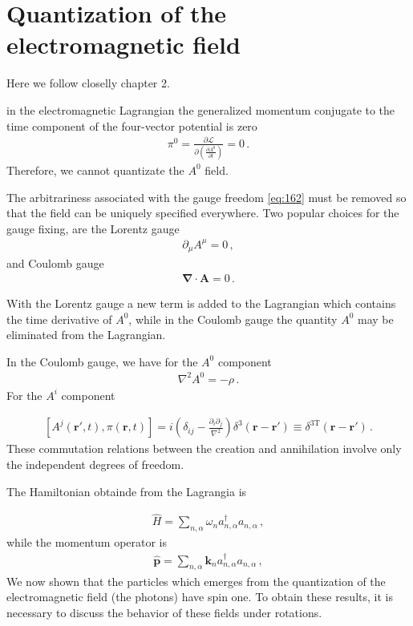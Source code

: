 \section{Quantization of the electromagnetic field}
Here we follow closelly \cite{Gross:1993} chapter 2.

in the electromagnetic Lagrangian the generalized momentum conjugate to the time component of the four-vector potential is zero
\begin{align}
  \pi^0=\frac{\partial\mathcal{L}}{\partial\left(\displaystyle{\frac{\partial A^0}{\partial t}}\right)}=0\,.
\end{align}
Therefore, we cannot quantizate the $A^0$ field.

The arbitrariness associated with the gauge freedom \eqref{eq:162} must be removed so that the field can be uniquely specified everywhere. Two popular choices for the gauge fixing, are the Lorentz gauge
\begin{align}
  \partial_\mu A^\mu=0\,,
\end{align}
and Coulomb gauge
\begin{align}
  \boldsymbol{\nabla}\cdot \mathbf{A}=0\,.
\end{align}

With the Lorentz gauge a new term is added to the Lagrangian which contains the time derivative of $A^0$, while in the Coulomb gauge the quantity $A^0$ may be eliminated from the Lagrangian.

In the Coulomb gauge, we have for the $A^0$ component
\begin{align}
  \nabla^2A^0=-\rho\,.
\end{align}
For the $A^i$ component

\begin{align}
  \left[A^j(\mathbf{r}',t),\pi(\mathbf{r},t)\right]=i\left(\delta_{ij}-\frac{\partial_i\partial_j}{\nabla^2}\right)\delta^3(\mathbf{r}-\mathbf{r}')
\equiv \delta^{3 \text{T}}(\mathbf{r}-\mathbf{r}')\,.
\end{align}
These commutation relations between the creation and annihilation involve only the independent degrees of freedom.

The Hamiltonian obtainde from the Lagrangia is

\begin{align}
  \widehat{H}=\sum_{n,\alpha}\omega_n a_{n,\alpha}^\dagger a_{n,\alpha}\,,
\end{align}
while the momentum operator is
\begin{align}
 \widehat{ \mathbf{p}}=\sum_{n,\alpha}\mathbf{k}_n a_{n,\alpha}^\dagger a_{n,\alpha}\,,
\end{align}
We now shown that the particles which emerges from the quantization of the electromagnetic field (the photons) have spin one. To obtain these results, it is necessary to discuss the behavior of these fields under rotations. 

